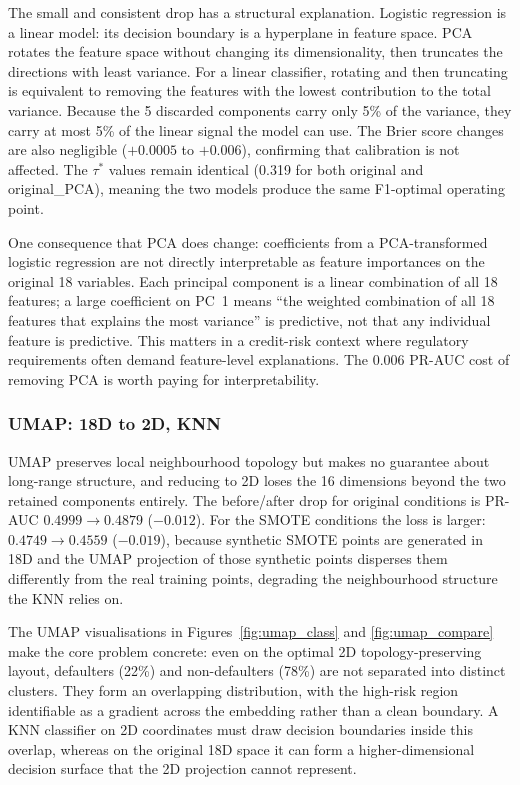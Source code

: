 \documentclass[12pt,a4paper]{article}
\begin{document}
The small and consistent drop has a structural explanation. Logistic regression
is a linear model: its decision boundary is a hyperplane in feature space.
PCA rotates the feature space without changing its dimensionality, then
truncates the directions with least variance. For a linear classifier, rotating
and then truncating is equivalent to removing the features with the lowest
contribution to the total variance. Because the 5 discarded components carry
only 5\% of the variance, they carry at most 5\% of the linear signal the
model can use. The Brier score changes are also negligible ($+0.0005$
to $+0.006$), confirming that calibration is not affected. The $\tau^*$
values remain identical (0.319 for both original and original\_PCA), meaning
the two models produce the same F1-optimal operating point.

One consequence that PCA does change: coefficients from a PCA-transformed
logistic regression are not directly interpretable as feature importances on
the original 18 variables. Each principal component is a linear combination
of all 18 features; a large coefficient on PC~1 means ``the weighted
combination of all 18 features that explains the most variance'' is
predictive, not that any individual feature is predictive. This matters in a
credit-risk context where regulatory requirements often demand feature-level
explanations. The 0.006 PR-AUC cost of removing PCA is worth paying for
interpretability.

\subsubsection*{UMAP: 18D to 2D, KNN}

UMAP preserves local neighbourhood topology but makes no guarantee about
long-range structure, and reducing to 2D loses the 16 dimensions beyond the
two retained components entirely. The before/after drop for original conditions
is PR-AUC $0.4999 \to 0.4879$ ($-0.012$). For the SMOTE conditions the loss
is larger: $0.4749 \to 0.4559$ ($-0.019$), because synthetic SMOTE points
are generated in 18D and the UMAP projection of those synthetic points
disperses them differently from the real training points, degrading the
neighbourhood structure the KNN relies on.

The UMAP visualisations in Figures~\ref{fig:umap_class} and
\ref{fig:umap_compare} make the core problem concrete: even on the optimal
2D topology-preserving layout, defaulters (22\%) and non-defaulters (78\%)
are not separated into distinct clusters. They form an overlapping
distribution, with the high-risk region identifiable as a gradient across
the embedding rather than a clean boundary. A KNN classifier on 2D
coordinates must draw decision boundaries inside this overlap, whereas
on the original 18D space it can form a higher-dimensional decision surface
that the 2D projection cannot represent.
\end{document}

